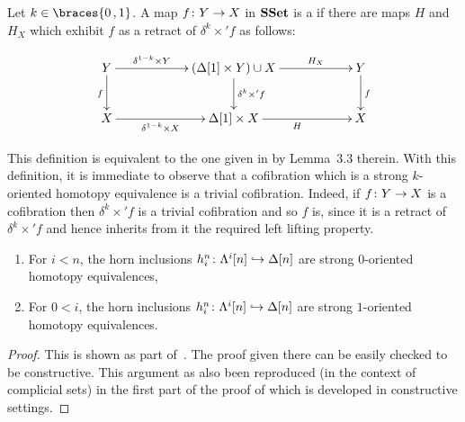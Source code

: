 \documentclass[reqno,10pt,a4paper,oneside,draft]{amsart}
\begin{document}


\begin{definition} \label{def:strhtpyequiv} Let $k \in \braces{0 \, , 1 }$.
A map $f \colon Y \rightarrow X$ in $\mathbf{SSet}$ is a  if there are maps $H$ and $H_X$ which exhibit $f$ as a retract of $\delta^k \times ' f$ as follows:

\[
\xymatrix@C=2cm{
Y \ar[d]_{f} \ar[r]^-{\delta^{1-k} \times Y} & 
( \Delta[1] \times Y ) \cup X \ar[d]^{\delta^k \times' f} \ar[r]^-{H_X} & 
Y \ar[d]^{f} \\
X \ar[r]_-{\delta^{1-k} \times X}  & 
\Delta[1] \times X \ar[r]_{H} &
X  }
\]
\end{definition}

This definition is equivalent to the one given in \cite{gambino2017frobenius} by Lemma~3.3 therein.
With this definition, it is immediate to observe that a cofibration which is a strong $k$-oriented homotopy equivalence is a trivial cofibration. Indeed, if $f \colon Y \to X$ is a cofibration then $\delta^k \times ' f$ is a trivial
cofibration and so $f$ is, since it is a retract of $\delta^k \times ' f$ and hence inherits from it the
required left lifting property.

\begin{lemma}\label{lemma:genTcof_strongHequiv} \hfill 
\begin{enumerate}[$(i)$]
\item For $i < n$, the horn inclusions $h^n_i \colon \Lambda^i[n] \hookrightarrow \Delta[n]$ are strong $0$-oriented homotopy equivalences,
\item For $0 < i $, the horn inclusions $h^n_i \colon \Lambda^i[n] \hookrightarrow \Delta[n]$ are strong $1$-oriented homotopy equivalences.
\end{enumerate}
\end{lemma}

\begin{proof}
This is shown as part of~\cite[Theorem 3.2.3]{joyal-tierney:simplicial-homotopy-theory}. The proof given there can be easily checked to be constructive. This argument as also been reproduced (in the context of complicial sets) in the first part of the proof of \cite[Proposition~5.2.6]{henry2018wms} which is developed in constructive settings.
\end{proof}
\end{document}
